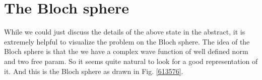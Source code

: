 \section{The Bloch sphere}

While we could just discuss the details of the above state in the abstract, it is extremely helpful to visualize the problem on the Bloch sphere. The idea of the Bloch sphere is that the we have a complex wave function of well defined norm and two free param. So it seems quite natural to look for a good representation of it. And this is the Bloch sphere as drawn in Fig. \ref{613576}. 